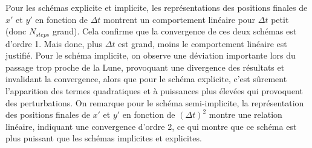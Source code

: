 \documentclass[a4paper,12pt,twoside]{article}
\begin{document}
Pour les schémas explicite et implicite, les représentations des positions finales de $x'$ et $y'$ en fonction de $\Delta t$ montrent un comportement linéaire pour $\Delta t$ petit (donc $N_{steps}$ grand). Cela confirme que la convergence de ces deux schémas est d’ordre 1. Mais donc, plus $\Delta t$ est grand, moins le comportement linéaire est justifié. Pour le schéma implicite, on observe une déviation importante lors du passage trop proche de la Lune, provoquant une divergence des résultats et invalidant la convergence, alors que pour le schéma explicite, c'est sûrement l'apparition des termes quadratiques et à puissances plus élevées qui provoquent des perturbations. On remarque pour le schéma semi-implicite, la représentation des positions finales de $x'$ et $y'$ en fonction de $(\Delta t)^2$ montre une relation linéaire, indiquant une convergence d’ordre 2, ce qui montre que ce schéma est plus puissant que les schémas implicites et explicites.
\end{document}
